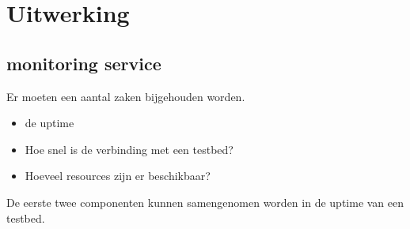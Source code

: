 \newpage
\chapter{Uitwerking}
\section{monitoring service}

Er moeten een aantal zaken bijgehouden worden.
\begin{itemize}
\item de uptime
\item Hoe snel is de verbinding met een testbed?
\item Hoeveel resources zijn er beschikbaar?
\end{itemize}
\npar
De eerste twee componenten kunnen samengenomen worden in de uptime van een testbed. 